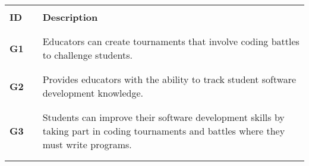 \begin{table}[H]
    \centering
    \renewcommand{\arraystretch}{0.5}
    \begin{tabular}{l l p{12.5cm}}
        \hline
                     &        &                                                                                                                                                                                     \\
        \textbf{ID}  & \vline & \textbf{Description}                                                                                                                                                                \\
                     &        &                                                                                                                                                                                     \\\hline & & \\
        \textbf{G1}  & \vline & Educators can create tournaments that involve coding battles to challenge students.                                                                                                 \\    
                     &        &                                                                                                                                                                                     \\\hline & & \\
        \textbf{G2}  & \vline & Provides educators with the ability to track student software development knowledge.                                                                                                \\ 
                     &        &                                                                                                                                                                                     \\\hline & & \\
        \textbf{G3}  & \vline & Students can improve their software development skills by taking part in coding tournaments and battles where they must write programs.                                             \\
                     &        &                                                                                                                                                                                     \\\hline & & \\

\end{tabular}
\end{table}
